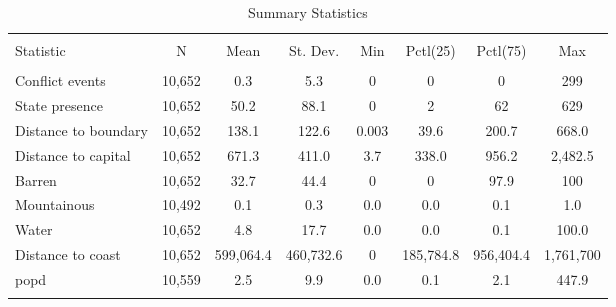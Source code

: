 
\begin{table}[!htbp] \centering 
  \caption{Summary Statistics} 
  \label{summarystats} 
\begin{tabular}{@{\extracolsep{1pt}}lccccccc} 
\\[-1.8ex]\hline 
\hline \\[-1.8ex] 
Statistic & \multicolumn{1}{c}{N} & \multicolumn{1}{c}{Mean} & \multicolumn{1}{c}{St. Dev.} & \multicolumn{1}{c}{Min} & \multicolumn{1}{c}{Pctl(25)} & \multicolumn{1}{c}{Pctl(75)} & \multicolumn{1}{c}{Max} \\ 
\hline \\[-1.8ex] 
Conflict events & 10,652 & 0.3 & 5.3 & 0 & 0 & 0 & 299 \\ 
State presence & 10,652 & 50.2 & 88.1 & 0 & 2 & 62 & 629 \\ 
Distance to boundary & 10,652 & 138.1 & 122.6 & 0.003 & 39.6 & 200.7 & 668.0 \\ 
Distance to capital & 10,652 & 671.3 & 411.0 & 3.7 & 338.0 & 956.2 & 2,482.5 \\ 
Barren & 10,652 & 32.7 & 44.4 & 0 & 0 & 97.9 & 100 \\ 
Mountainous & 10,492 & 0.1 & 0.3 & 0.0 & 0.0 & 0.1 & 1.0 \\ 
Water & 10,652 & 4.8 & 17.7 & 0.0 & 0.0 & 0.1 & 100.0 \\ 
Distance to coast & 10,652 & 599,064.4 & 460,732.6 & 0 & 185,784.8 & 956,404.4 & 1,761,700 \\ 
popd & 10,559 & 2.5 & 9.9 & 0.0 & 0.1 & 2.1 & 447.9 \\ 
\hline \\[-1.8ex] 
\end{tabular} 
\end{table} 
